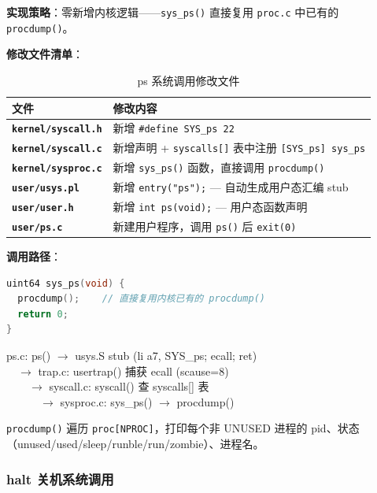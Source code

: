\documentclass[12pt,a4paper]{ctexart}
\begin{document}
\textbf{实现策略}：零新增内核逻辑——\texttt{sys\_ps()} 直接复用 \texttt{proc.c} 中已有的 \texttt{procdump()}。

\textbf{修改文件清单}：

\begin{table}[H]
\centering
\caption{ps 系统调用修改文件}
\begin{tabular}{>{\bfseries}p{4.5cm}p{8cm}}
\toprule
\textbf{文件} & \textbf{修改内容} \\
\midrule
\texttt{kernel/syscall.h} & 新增 \texttt{\#define SYS\_ps 22} \\
\texttt{kernel/syscall.c} & 新增声明 + \texttt{syscalls[]} 表中注册 \texttt{[SYS\_ps] sys\_ps} \\
\texttt{kernel/sysproc.c} & 新增 \texttt{sys\_ps()} 函数，直接调用 \texttt{procdump()} \\
\texttt{user/usys.pl} & 新增 \texttt{entry("ps");} — 自动生成用户态汇编 stub \\
\texttt{user/user.h} & 新增 \texttt{int ps(void);} — 用户态函数声明 \\
\texttt{user/ps.c} & 新建用户程序，调用 \texttt{ps()} 后 \texttt{exit(0)} \\
\bottomrule
\end{tabular}
\end{table}

\textbf{调用路径}：
\begin{lstlisting}[language=C, caption={sys\_ps() 实现（kernel/sysproc.c）}]
uint64 sys_ps(void) {
  procdump();    // 直接复用内核已有的 procdump()
  return 0;
}
\end{lstlisting}

\begin{flushleft}
\small\ttfamily
ps.c: ps() $\rightarrow$ usys.S stub (li a7, SYS\_ps; ecall; ret) \\
~~$\rightarrow$ trap.c: usertrap() 捕获 ecall (scause=8)        \\
~~~~$\rightarrow$ syscall.c: syscall() 查 syscalls[] 表          \\
~~~~~~$\rightarrow$ sysproc.c: sys\_ps() $\rightarrow$ procdump()
\end{flushleft}

\texttt{procdump()} 遍历 \texttt{proc[NPROC]}，打印每个非 UNUSED 进程的 pid、状态（unused/used/sleep/runble/run/zombie）、进程名。

\subsubsection{halt 关机系统调用}
\end{document}
